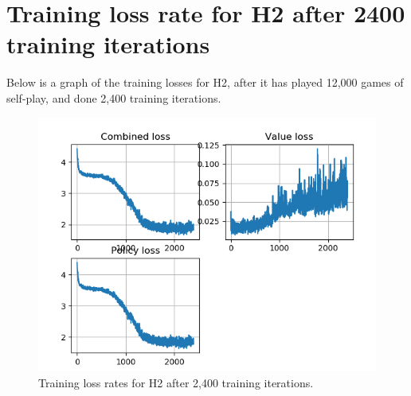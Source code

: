 
\clearpage
\section{Training loss rate for H2 after 2400 training iterations}
Below is a graph of the training losses for H2, after it has played 12,000 games of self-play, and done 2,400 training iterations.

\begin{figure}[ht]
	\centering
	\includegraphics[width=.9\textwidth]{figures/loss-2400}
	\caption{Training loss rates for H2 after 2,400 training iterations.}
	\label{fig-loss-2400}
\end{figure}
